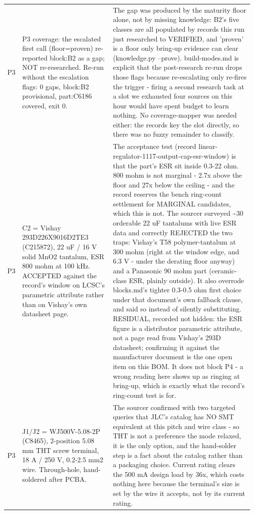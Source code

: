 \documentclass[11pt,a4paper]{article}
\begin{document}
{\begin{longtable}{lp{5.2cm}p{7.2cm}}
P3 & P3 coverage: the escalated first call (floor=proven) re-reported block:B2 as a gap; NOT re-researched. Re-run without the escalation flags: 0 gaps, block:B2 provisional, part:C6186 covered, exit 0. & The gap was produced by the maturity floor alone, not by missing knowledge: B2's five classes are all populated by records this run just researched to VERIFIED, and 'proven' is a floor only bring-up evidence can clear (knowledge.py --prove). build-modes.md is explicit that the post-research re-run drops those flags because re-escalating only re-fires the trigger - firing a second research task at a slot we exhausted four sources on this hour would have spent budget to learn nothing. No coverage-mapper was needed either: the records key the slot directly, so there was no fuzzy remainder to classify. \\
P3 & C2 = Vishay 293D226X9016D2TE3 (C215872), 22 uF / 16 V solid MnO2 tantalum, ESR 800 mohm at 100 kHz. ACCEPTED against the record's window on LCSC's parametric attribute rather than on Vishay's own datasheet page. & The acceptance test (record linear-regulator-1117-output-cap-esr-window) is that the part's ESR sit inside 0.3-22 ohm. 800 mohm is not marginal - 2.7x above the floor and 27x below the ceiling - and the record reserves the bench ring-count settlement for MARGINAL candidates, which this is not. The sourcer surveyed \textasciitilde{}30 orderable 22 uF tantalums with live ESR data and correctly REJECTED the two traps: Vishay's T58 polymer-tantalum at 300 mohm (right at the window edge, and 6.3 V - under the derating floor anyway) and a Panasonic 90 mohm part (ceramic-class ESR, plainly outside). It also overrode blocks.md's tighter 0.3-0.5 ohm first choice under that document's own fallback clause, and said so instead of silently substituting. RESIDUAL, recorded not hidden: the ESR figure is a distributor parametric attribute, not a page read from Vishay's 293D datasheet; confirming it against the manufacturer document is the one open item on this BOM. It does not block P4 - a wrong reading here shows up as ringing at bring-up, which is exactly what the record's ring-count test is for. \\
P3 & J1/J2 = WJ500V-5.08-2P (C8465), 2-position 5.08 mm THT screw terminal, 18 A / 250 V, 0.2-2.5 mm2 wire. Through-hole, hand-soldered after PCBA. & The sourcer confirmed with two targeted queries that JLC's catalog has NO SMT equivalent at this pitch and wire class - so THT is not a preference the mode relaxed, it is the only option, and the hand-solder step is a fact about the catalog rather than a packaging choice. Current rating clears the 500 mA design load by 36x, which costs nothing here because the terminal's size is set by the wire it accepts, not by its current rating. \\

\end{longtable}}
\end{document}
